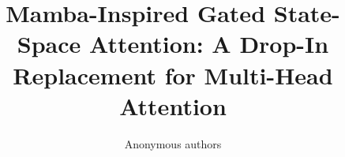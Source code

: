 \title{\textbf{Mamba-Inspired Gated State-Space Attention: A Drop-In Replacement for Multi-Head Attention}}

\author{Anonymous authors}
